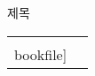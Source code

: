 \begin{frame}[t]{제목}
	\begin{tabular}{ll}
		\begin{minipage}[t]{0.45\textwidth}\scriptsize
			\begin{figure}[t]
				\texttt{[image: \\bookfile]}
			\end{figure}
		\end{minipage}	
		&
		\begin{minipage}[t]{0.5\textwidth} \scriptsize	
			
			
		\end{minipage}
	\end{tabular}
\end{frame}




